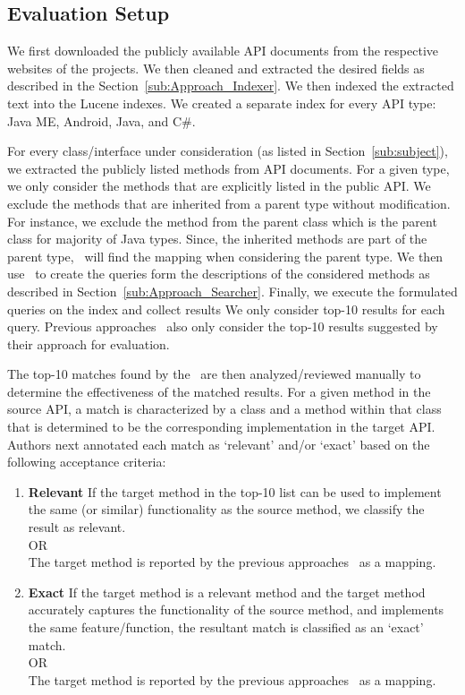 \subsection{Evaluation Setup}


We first downloaded the publicly available API documents from the respective websites of the projects. We then cleaned and extracted the desired fields as described in the Section~\ref{sub:Approach_Indexer}. We then indexed the extracted text into the Lucene indexes.
We created a separate index for every API type: Java ME, Android, Java, and C\#. 


For every class/interface under consideration (as listed in Section~\ref{sub:subject}),
we extracted the publicly listed methods from API documents.
For a given type, we only consider the methods that are explicitly listed in the public API.
We exclude the methods that are inherited from a parent type without modification.
For instance, we exclude the  method from the parent class  which is the parent class for majority of Java types.
Since, the inherited methods are part of the parent type,
\tool\ will find the mapping when considering the parent type.
We then use \tool\ to create the queries form the descriptions of the considered methods as described in Section~\ref{sub:Approach_Searcher}.
Finally, we execute the formulated queries on the index and collect results
We only consider top-10 results for each query.
Previous approaches~\cite{chatterjee2009sniff,Gokhale2013ICSE}
also only consider the top-10 results suggested by their approach for evaluation.


The top-10 matches found by the \tool\ are then analyzed/reviewed manually to determine the effectiveness of the matched results.
For a given method in the source API, a match is characterized by a class and a method within that class that is determined to be the corresponding implementation in the target API.
Authors next annotated each match as `relevant' and/or `exact' based on the following acceptance criteria:
\begin{enumerate}
	\item{\textbf{Relevant}} If the target method in the top-10 list can be used to implement the same (or similar) functionality as the source method, we classify the result as relevant.\\
	OR\\
	The target method is reported by the previous approaches~\cite{Gokhale2013ICSE,nguyen2014statistical} as a mapping.

	\item{\textbf{Exact}} If the target method is a relevant method and the target method accurately captures the functionality of the source method, and implements the same feature/function, the resultant match is classified as an `exact' match.\\
	OR\\
	The target method is reported by the previous approaches~\cite{Gokhale2013ICSE,nguyen2014statistical} as a mapping.
\end{enumerate}

